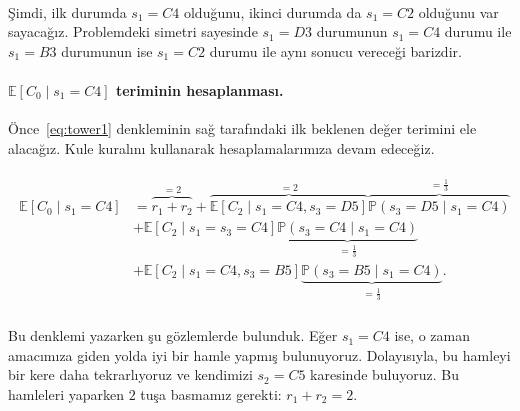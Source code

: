 %
\hphantom{aha} \\[-2ex]
\c{S}imdi, ilk durumda $s_1 = C4$ oldu\u{g}unu, ikinci durumda da $s_1 = C2$
oldu\u{g}unu var sayaca\u{g}{\i}z. Problemdeki simetri sayesinde $s_1 = D3$
durumunun $s_1 = C4$ durumu ile $s_1 = B3$ durumunun ise $s_1 = C2$ durumu ile
ayn{\i} sonucu verece\u{g}i barizdir. 

\vspace{-3mm}
\paragraph{$\mathbb{E}\left[ C_0 \mid s_1 = C4 \right]$ teriminin
hesaplanmas{\i}.} \"{O}nce~\eqref{eq:tower1} denkleminin sa\u{g} taraf{\i}ndaki
ilk beklenen de\u{g}er terimini ele alaca\u{g}{\i}z. Kule kural{\i}n{\i}
kullanarak hesaplamalar{\i}m{\i}za devam edece\u{g}iz. 

\vspace{-8mm}
\begin{align}
    \begin{split}
    \mathbb{E}\left[ C_0 \mid s_1 = C4 \right] &= \overbrace{r_1 + r_2}^{=2} 
    + \overbrace{\mathbb{E}[C_2 \mid s_1 = C4, s_3 = D5]}^{=2} \overbrace{\mathbb{P}(s_3 = D5 \mid s_1 = C4)}^{=\frac{1}{3}} \\
    &+ \mathbb{E}[C_2 \mid s_1 = s_3 = C4] \underbrace{\mathbb{P}(s_3 = C4 \mid s_1 = C4)}_{=\frac{1}{3}} \\
    &+ \mathbb{E}[C_2 \mid s_1 = C4, s_3 = B5] \underbrace{\mathbb{P}(s_3 = B5 \mid s_1 = C4)}_{=\frac{1}{3}}.
    \end{split}
    \label{eq:tower2}
\end{align}
%
\hphantom{aha} \\[-3ex]
Bu denklemi yazarken \c{s}u g\"{o}zlemlerde bulunduk. E\u{g}er $s_1 = C4$ ise, o
zaman amac{\i}m{\i}za giden yolda iyi bir hamle yapm{\i}\c{s} bulunuyoruz.
Dolay{\i}s{\i}yla, bu hamleyi bir kere daha tekrarl{\i}yoruz ve kendimizi $s_2 =
C5$ karesinde buluyoruz. Bu hamleleri yaparken $2$ tu\c{s}a basmam{\i}z gerekti:
$r_1 + r_2 = 2$.

